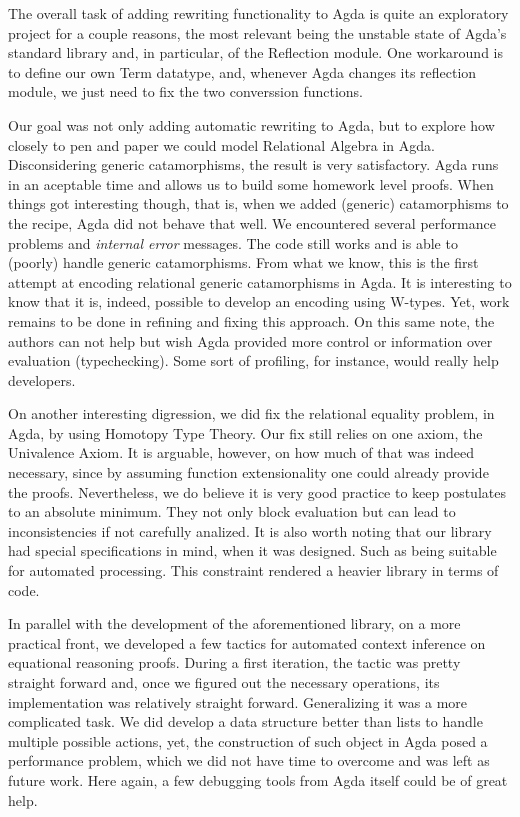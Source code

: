 The overall task of adding rewriting functionality to Agda is quite an exploratory 
project for a couple reasons, the most relevant being the unstable state of Agda's
standard library and, in particular, of the Reflection module. One workaround
is to define our own Term datatype, and, whenever Agda changes its reflection module,
we just need to fix the two converssion functions.

Our goal was not only adding automatic rewriting to Agda, but to explore how closely
to pen and paper we could model Relational Algebra in Agda. Disconsidering generic catamorphisms,
the result is very satisfactory. Agda runs in an aceptable time and allows us to build
some homework level proofs. When things got interesting though, that is, when we added (generic) catamorphisms to
the recipe, Agda did not behave that well. We encountered several performance problems
and \emph{internal error} messages. The code still works and is able to (poorly) handle
generic catamorphisms. From what we know, this is the first attempt at encoding relational generic catamorphisms
in Agda. It is interesting to know that it is, indeed, possible to develop an encoding using W-types. Yet,
work remains to be done in refining and fixing this approach. On this same note, the authors
can not help but wish Agda provided more control or information over evaluation (typechecking).
Some sort of profiling, for instance, would really help developers.

On another interesting digression, we did fix the relational equality problem, in Agda,
by using Homotopy Type Theory. Our fix still relies on one axiom, the Univalence Axiom.
It is arguable, however, on how much of that was indeed necessary, since by assuming
function extensionality one could already provide the proofs.
Nevertheless, we do believe it is very good practice to keep postulates to an absolute minimum. 
They not only block evaluation but can lead to inconsistencies if not carefully analized. 
It is also worth noting that our library had special specifications in mind, when it was designed.
Such as being suitable for automated processing. This constraint rendered a heavier library
in terms of code.

In parallel with the development of the aforementioned library, on a more practical front,
we developed a few tactics for automated context inference on equational reasoning proofs.
During a first iteration, the tactic was pretty straight forward and, once we figured out
the necessary  operations, its implementation was relatively straight forward.
Generalizing it was a more complicated task. We did develop a data structure better than lists to
handle multiple possible actions, yet, the construction of such object in Agda posed a 
performance problem, which we did not have time to overcome and was left as future work.
Here again, a few debugging tools from Agda itself could be of great help.

